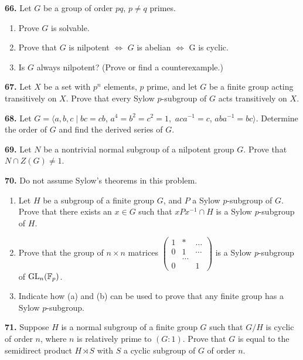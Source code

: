 \documentclass[a4paper,11pt,final]{memoir}%
\theoremstyle{nonumberplain}
\begin{document}
\medskip\noindent\textbf{66.} Let $G$ be a group of order $pq$, $p\neq q$ primes.

\begin{enumerate}
\item Prove $G$ is solvable.

\item Prove that $G$ is nilpotent $\iff$ $G$ is abelian $\iff$ G is cyclic.

\item Is $G$ always nilpotent? (Prove or find a counterexample.)
\end{enumerate}

\medskip\noindent\textbf{67.} Let $X$ be a set with $p^{n}$ elements, $p$
prime, and let $G$ be a finite group acting transitively on $X$. Prove that
every Sylow $p$-subgroup of $G$ acts transitively on $X$.

\medskip\noindent\textbf{68.} Let $G=\langle a,b,c\mid bc=cb$, $a^{4}%
=b^{2}=c^{2}=1,$ $aca^{-1}=c$, $aba^{-1}=bc\rangle$. Determine the order of
$G$ and find the derived series of $G$.

\medskip\noindent\textbf{69.} Let $N$ be a nontrivial normal subgroup of a
nilpotent group $G$. Prove that $N\cap Z(G)\neq1$.

\medskip\noindent\textbf{70.} Do not assume Sylow's theorems in this problem.

\begin{enumerate}
\item Let $H$ be a subgroup of a finite group $G$, and $P$ a Sylow
$p$-subgroup of $G$. Prove that there exists an $x\in G$ such that
$xPx^{-1}\cap H$ is a Sylow $p$-subgroup of $H$.

\item Prove that the group of $n\times n$ matrices $%
\begin{pmatrix}
1 & \ast & \ldots\\
0 & 1 & \cdots\\
& \ldots & \\
0 &  & 1
\end{pmatrix}
$ is a Sylow $p$-subgroup of $\operatorname{GL}_{n}(\mathbb{F}_{p})$.

\item Indicate how (a) and (b) can be used to prove that any finite group has
a Sylow $p$-subgroup.
\end{enumerate}

\medskip\noindent\textbf{71.} Suppose $H$ is a normal subgroup of a finite
group $G$ such that $G/H$ is cyclic of order $n$, where $n$ is relatively
prime to $(G:1)$. Prove that $G$ is equal to the semidirect product $H\rtimes
S$ with $S$ a cyclic subgroup of $G$ of order $n$.
\end{document}

